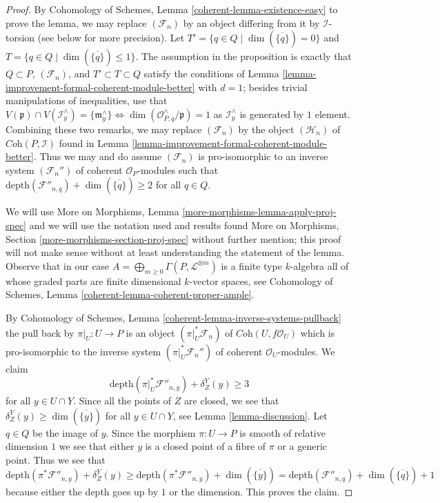 \begin{proof}
By Cohomology of Schemes, Lemma \ref{coherent-lemma-existence-easy}
to prove the lemma, we may replace $(\mathcal{F}_n)$ by an object
differing from it by $\mathcal{I}$-torsion (see below for more precision).
Let $T' = \{q \in Q \mid \dim(\overline{\{q\}}) = 0\}$
and $T = \{q \in Q \mid \dim(\overline{\{q\}}) \leq 1\}$.
The assumption in the proposition is exactly that
$Q \subset P$, $(\mathcal{F}_n)$, and $T' \subset T \subset Q$
satisfy the conditions of
Lemma \ref{lemma-improvement-formal-coherent-module-better}
with $d = 1$; besides trivial manipulations of inequalities, use that
$V(\mathfrak p) \cap V(\mathcal{I}^\wedge_y) = \{\mathfrak m^\wedge_y\}
\Leftrightarrow \dim(\mathcal{O}_{P, q}^\wedge/\mathfrak p) = 1$
as $\mathcal{I}_y^\wedge$ is generated by $1$ element.
Combining these two remarks, we may replace $(\mathcal{F}_n)$ by the
object $(\mathcal{H}_n)$ of $\textit{Coh}(P, \mathcal{I})$ found in
Lemma \ref{lemma-improvement-formal-coherent-module-better}.
Thus we may and do assume $(\mathcal{F}_n)$ is pro-isomorphic to
an inverse system $(\mathcal{F}_n'')$ of coherent $\mathcal{O}_P$-modules
such that $\text{depth}(\mathcal{F}''_{n, q}) + \dim(\overline{\{q\}}) \geq 2$
for all $q \in Q$.

\medskip\noindent
We will use More on Morphisms, Lemma \ref{more-morphisms-lemma-apply-proj-spec}
and we will use the notation used and results found
More on Morphisms, Section \ref{more-morphisms-section-proj-spec}
without further mention; this proof will not make sense without
at least understanding the statement of the lemma.
Observe that in our case
$A = \bigoplus_{m \geq 0} \Gamma(P, \mathcal{L}^{\otimes m})$
is a finite type $k$-algebra
all of whose graded parts are finite dimensional $k$-vector spaces, see
Cohomology of Schemes, Lemma \ref{coherent-lemma-coherent-proper-ample}.

\medskip\noindent
By Cohomology of Schemes, Lemma \ref{coherent-lemma-inverse-systems-pullback}
the pull back by $\pi|_U : U \to P$ is an object
$(\pi|_U^*\mathcal{F}_n)$ of $\textit{Coh}(U, f\mathcal{O}_U)$
which is pro-isomorphic to the inverse system
$(\pi|_U^*\mathcal{F}_n'')$ of coherent $\mathcal{O}_U$-modules.
We claim
$$
\text{depth}(\pi|_U^*\mathcal{F}''_{n, y}) + \delta_Z^Y(y) \geq 3
$$
for all $y \in U \cap Y$. Since all the points of $Z$ are closed, we
see that $\delta_Z^Y(y) \geq \dim(\overline{\{y\}})$ for all
$y \in U \cap Y$, see Lemma \ref{lemma-discussion}.
Let $q \in Q$ be the image of $y$. Since the morphism $\pi : U \to P$ is
smooth of relative dimension $1$ we see that either $y$ is a closed point
of a fibre of $\pi$ or a generic point.
Thus we see that
$$
\text{depth}(\pi^*\mathcal{F}''_{n, y}) + \delta_Z^Y(y)
\geq
\text{depth}(\pi^*\mathcal{F}''_{n, y}) + \dim(\overline{\{y\}}) =
\text{depth}(\mathcal{F}''_{n, q}) + \dim(\overline{\{q\}}) + 1
$$
because either the depth goes up by $1$ or the dimension.
This proves the claim.


\end{proof}
